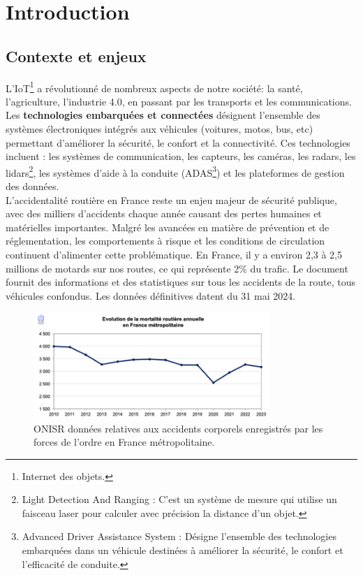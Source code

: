 \section{Introduction}
\subsection{Contexte et enjeux}
L'IoT\footnote{Internet des objets.} a révolutionné de nombreux aspects de notre société: la santé, l'agriculture, l'industrie 4.0, en passant par les transports et les communications.
Les \textbf{technologies embarquées et connectées} désignent l’ensemble des systèmes électroniques intégrés aux véhicules (voitures, motos, bus, etc) permettant d’améliorer la sécurité, le confort et la connectivité. Ces technologies incluent : les systèmes de communication, les capteurs, les caméras, les radars, les lidars\footnote{Light Detection And Ranging : C'est un système de mesure qui utilise un faisceau laser pour calculer avec précision la distance d’un objet.}, les systèmes d’aide à la conduite (ADAS\footnote{Advanced Driver Assistance System : Désigne l’ensemble des technologies embarquées dans un véhicule destinées à améliorer la sécurité, le confort et l’efficacité de conduite. }) et les plateformes de gestion des données.\\
L’accidentalité routière en France reste un enjeu majeur de sécurité publique, avec des milliers d’accidents chaque année causant des pertes humaines et matérielles importantes. Malgré les avancées en matière de prévention et de réglementation, les comportements à risque et les conditions de circulation continuent d’alimenter cette problématique.
En France, il y a environ 2,3 à 2,5 millions de motards\cite{actiEouteNbMotardFr} sur nos routes, ce qui représente 2\%  du trafic.
Le document\cite{la_securite_routiere_accidentalite_2024} fournit des informations et des statistiques sur tous les accidents de la route, tous véhicules confondus. Les données définitives datent du 31 mai 2024.

\begin{figure}[h]
    \centering
    \includegraphics[width=0.8\textwidth]{images/evolution_mortalite_securite_routiere_france.png} 
    \caption{ONISR données relatives aux accidents corporels enregistrés par les forces de l'ordre en France métropolitaine.}
\end{figure}

